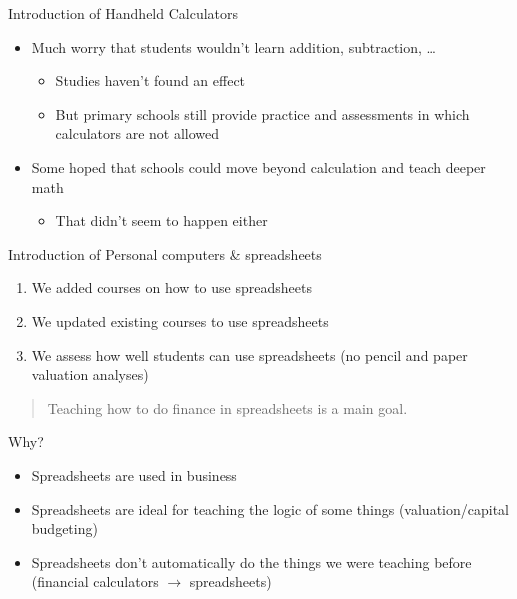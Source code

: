 \documentclass[
  ignorenonframetext,
]{beamer}
\providecommand{\tightlist}{%
  \setlength{\itemsep}{0pt}\setlength{\parskip}{0pt}}
\begin{document}
\begin{frame}{Introduction of Handheld Calculators}
\label{introduction-of-handheld-calculators}
\begin{itemize}
\tightlist
\item
  Much worry that students wouldn't learn addition, subtraction,
  \ldots{}

  \begin{itemize}
  \tightlist
  \item
    Studies haven't found an effect
  \item
    But primary schools still provide practice and assessments in which
    calculators are not allowed
  \end{itemize}
\item
  Some hoped that schools could move beyond calculation and teach deeper
  math

  \begin{itemize}
  \tightlist
  \item
    That didn't seem to happen either
  \end{itemize}
\end{itemize}
\end{frame}

\begin{frame}{Introduction of Personal computers \& spreadsheets}
\label{introduction-of-personal-computers-spreadsheets}
\begin{enumerate}
\tightlist
\item
  We added courses on how to use spreadsheets
\item
  We updated existing courses to use spreadsheets
\item
  We assess how well students can use spreadsheets (no pencil and paper
  valuation analyses)
\end{enumerate}

\begin{quote}
Teaching how to do finance in spreadsheets is a main goal.
\end{quote}
\end{frame}

\begin{frame}{Why?}
\label{why}
\begin{itemize}
\tightlist
\item
  Spreadsheets are used in business
\item
  Spreadsheets are ideal for teaching the logic of some things
  (valuation/capital budgeting)
\item
  Spreadsheets don't automatically do the things we were teaching before
  (financial calculators \(\rightarrow\) spreadsheets)
\end{itemize}
\end{frame}
\end{document}
